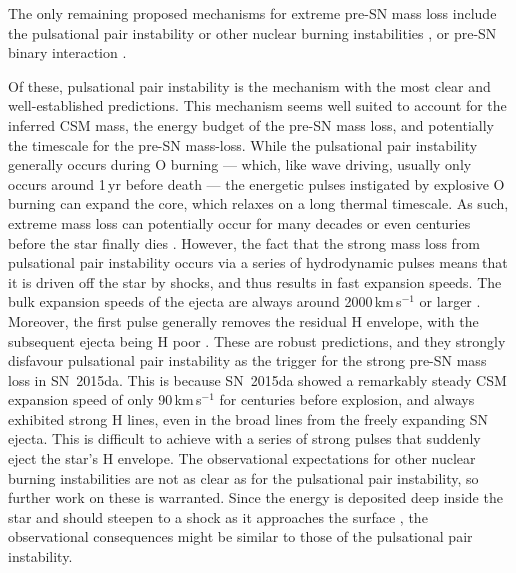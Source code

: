 \documentclass[fleqn,usenatbib,useAMS]{mnras}
\begin{document}
The only remaining proposed mechanisms for extreme pre-SN mass loss
include the pulsational pair instability or other nuclear burning
instabilities \citep{woosley07,woosley17,sa14,am11,renzo20}, or pre-SN
binary interaction \citep{sa14,schroder20,fw98}.  

Of these,
pulsational pair instability is the mechanism with the most clear and
well-established predictions.  This mechanism seems well suited to
account for the inferred CSM mass, the energy budget
of the pre-SN mass loss, and potentially the timescale for the
pre-SN mass-loss.  While the pulsational pair instability generally
occurs during O burning --- which, like wave driving, usually only
occurs around 1\,yr before death --- the energetic pulses instigated by
explosive O burning can expand the core, which relaxes on a long
thermal timescale.  As such, extreme mass loss can potentially occur
for many decades or even centuries before the star finally dies \citep{woosley17}.
However, the fact that the strong mass loss from pulsational pair
instability occurs via a series of hydrodynamic pulses means that it
is driven off the star by shocks, and thus results in fast
expansion speeds.  The bulk expansion speeds of the ejecta are always
around 2000\,km\,s$^{-1}$ or larger \citep{woosley17,renzo20,ws22}.
Moreover, the first pulse generally removes the residual H envelope,
with the subsequent ejecta being H poor \citep{renzo20,ws22}.  These
are robust predictions, and they strongly disfavour pulsational
pair instability as the trigger for the strong pre-SN mass loss in
SN~2015da.  This is because SN~2015da showed a remarkably steady CSM
expansion speed of only 90\,km\,s$^{-1}$ for centuries before explosion,
and always exhibited strong H lines, even in the broad lines from the
freely expanding SN ejecta.  This is difficult to achieve with a
series of strong pulses that suddenly eject the star's H envelope.  The
observational expectations for other nuclear burning instabilities are
not as clear as for the pulsational pair instability, so further work
on these is warranted.  Since the energy is deposited deep inside the
star and should steepen to a shock as it approaches the surface
\citep{fr18}, the observational consequences might be similar to those
of the pulsational pair instability.
\end{document}
